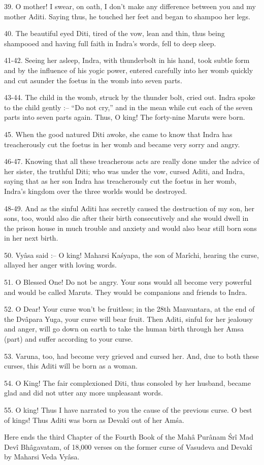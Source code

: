 39. O mother! I swear, on oath, I don't make any difference between you and my mother Aditi. Saying thus, he touched her feet and began to shampoo her legs.

40. The beautiful eyed Diti, tired of the vow, lean and thin, thus being shampooed and having full faith in Indra's words, fell to deep sleep.

41-42. Seeing her asleep, Indra, with thunderbolt in his hand, took subtle form and by the influence of his yogic power, entered carefully into her womb quickly and cut asunder the foetus in the womb into seven parts.

43-44. The child in the womb, struck by the thunder bolt, cried out. Indra spoke to the child gently :-- ``Do not cry,'' and in the mean while cut each of the seven parts into seven parts again. Thus, O king! The forty-nine Maruts were born.

45. When the good natured Diti awoke, she came to know that Indra has treacherously cut the foetus in her womb and became very sorry and angry.

46-47. Knowing that all these treacherous acts are really done under the advice of her sister, the truthful Diti; who was under the vow, cursed Aditi, and Indra, saying that as her son Indra has treacherously cut the foetus in her womb, Indra's kingdom over the three worlds would be destroyed.

48-49. And as the sinful Aditi has secretly caused the destruction of my son, her sons, too, would also die after their birth consecutively and she would dwell in the prison house in much trouble and anxiety and would also bear still born sons in her next birth.

50. Vy\^asa said :-- O king! Maharsi Ka\'syapa, the son of Mar\^ichi, hearing the curse, allayed her anger with loving words.

51. O Blessed One! Do not be angry. Your sons would all become very powerful and would be called Maruts. They would be companions and friends to Indra.

52. O Dear! Your curse won't be fruitless; in the 28th Manvantara, at the end of the Dv\^apara Yuga, your curse will bear fruit. Then Aditi, sinful for her jealousy and anger, will go down on earth to take the human birth through her Amsa (part) and suffer according to your curse.

53. Varuna, too, had become very grieved and cursed her. And, due to both these curses, this Aditi will be born as a woman.

54. O King! The fair complexioned Diti, thus consoled by her husband, became glad and did not utter any more unpleasant words.

55. O king! Thus I have narrated to you the cause of the previous curse. O best of kings! Thus Aditi was born as Devak\^i out of her Am\'sa.

Here ends the third Chapter of the Fourth Book of the Mah\^a Pur\^anam \'Sr\^i Mad Dev\^i Bh\^agavatam, of 18,000 verses on the former curse of Vasudeva and Devak\^i by Maharsi Veda Vy\^asa.